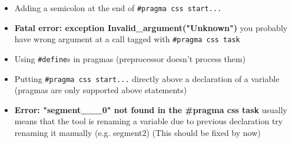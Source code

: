 \documentclass[letterpaper]{article}
\begin{document}
\begin{itemize}
  \item Adding a semicolon at the end of \verb!#pragma css start...!
  \item \textbf{{Fatal error: exception Invalid\_argument("Unknown")}} you
      probably have wrong argument at a call tagged with \verb!#pragma css task!
  \item Using \verb!#define!s in pragmas (preprocessor doesn't process them)
  \item Putting \verb!#pragma css start...! directly above a declaration of a variable (pragmas are only supported above statements)
  \item \textbf{Error: "segment\_\_\_0" not found in the \#pragma css task} 
  usually means that the tool is renaming a variable due to previous declaration
  try renaming it manually (e.g. segment2) (This should be fixed by now)
\end{itemize}
\end{document}
